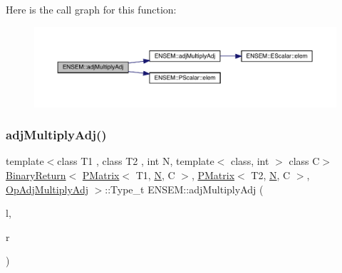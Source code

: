 Here is the call graph for this function\+:\nopagebreak
\begin{figure}[H]
\begin{center}
\leavevmode
\includegraphics[width=350pt]{df/d0a/group__primmatrix_ga5b52c2e633a016e706b74e388b8af102_cgraph}
\end{center}
\end{figure}
\mbox{\label{group__primmatrix_ga81c788e54ea0f4c4de97e7bfa9d7cd89}} 
\subsubsection{\texorpdfstring{adjMultiplyAdj()}{adjMultiplyAdj()}\hspace{0.1cm}{\footnotesize\ttfamily [3/3]}}
{\footnotesize\ttfamily template$<$class T1 , class T2 , int N, template$<$ class, int $>$ class C$>$ \\
\mbox{\hyperlink{structENSEM_1_1BinaryReturn}{Binary\+Return}}$<$ \mbox{\hyperlink{classENSEM_1_1PMatrix}{P\+Matrix}}$<$ T1, \mbox{\hyperlink{adat__devel_2lib_2hadron_2operator__name__util_8cc_a7722c8ecbb62d99aee7ce68b1752f337}{N}}, C $>$, \mbox{\hyperlink{classENSEM_1_1PMatrix}{P\+Matrix}}$<$ T2, \mbox{\hyperlink{adat__devel_2lib_2hadron_2operator__name__util_8cc_a7722c8ecbb62d99aee7ce68b1752f337}{N}}, C $>$, \mbox{\hyperlink{structENSEM_1_1OpAdjMultiplyAdj}{Op\+Adj\+Multiply\+Adj}} $>$\+::Type\+\_\+t E\+N\+S\+E\+M\+::adj\+Multiply\+Adj (\begin{DoxyParamCaption}\item[{const \mbox{\hyperlink{classENSEM_1_1PMatrix}{P\+Matrix}}$<$ T1, \mbox{\hyperlink{adat__devel_2lib_2hadron_2operator__name__util_8cc_a7722c8ecbb62d99aee7ce68b1752f337}{N}}, C $>$ \&}]{l,  }\item[{const \mbox{\hyperlink{classENSEM_1_1PMatrix}{P\+Matrix}}$<$ T2, \mbox{\hyperlink{adat__devel_2lib_2hadron_2operator__name__util_8cc_a7722c8ecbb62d99aee7ce68b1752f337}{N}}, C $>$ \&}]{r }\end{DoxyParamCaption})\hspace{0.3cm}{\ttfamily [inline]}}

